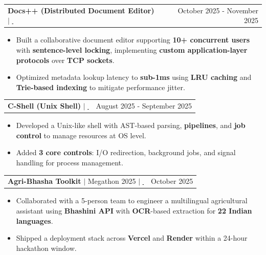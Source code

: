 \documentclass[letterpaper,11pt]{article}
\makeatletter
\newcommand{\resumeItem}[1]{
  \item \small #1\vspace{-3pt}
}
\newcommand{\resumeProjectHeading}[2]{
    \item
    \begin{tabular*}{0.97\textwidth}{l@{\extracolsep{\fill}}r}
      \small#1 & #2 \\
    \end{tabular*}\vspace{-7pt}
}
\newcommand{\extlinkicon}{\,\raisebox{0.05ex}{\footnotesize\faExternalLinkSquare}}
\newcommand{\resumeItemListStart}{\begin{itemize}}
\newcommand{\resumeItemListEnd}{\end{itemize}\vspace{-5pt}}
\makeatother
\begin{document}
    \resumeProjectHeading
          {\textbf{Docs++ (Distributed Document Editor)} $|$ \href{https://github.com/devpatel301/Docs-Plus-Plus}{\extlinkicon}}{October 2025 - November 2025}
          \resumeItemListStart
            \resumeItem{Built a collaborative document editor supporting \textbf{10+ concurrent users} with \textbf{sentence-level locking}, implementing \textbf{custom application-layer protocols} over \textbf{TCP sockets}.}
            \resumeItem{Optimized metadata lookup latency to \textbf{sub-1ms} using \textbf{LRU caching} and \textbf{Trie-based indexing} to mitigate performance jitter.}
          \resumeItemListEnd
      \resumeProjectHeading
          {\textbf{C-Shell (Unix Shell)} $|$ \href{https://github.com/devpatel301/C-Shell}{\extlinkicon}}{August 2025 - September 2025}
          \resumeItemListStart
            \resumeItem{Developed a Unix-like shell with AST-based parsing, \textbf{pipelines}, and \textbf{job control} to manage resources at OS level.}
            \resumeItem{Added \textbf{3 core controls}: I/O redirection, background jobs, and signal handling for process management.}
          \resumeItemListEnd
      
                
      \resumeProjectHeading
          {\textbf{Agri-Bhasha Toolkit} $|$ Megathon 2025 $|$ \href{https://github.com/devpatel301/agri-bhasha-test-frontend}{\extlinkicon}}{October 2025}
          \resumeItemListStart
            \resumeItem{Collaborated with a 5-person team to engineer a multilingual agricultural assistant using \textbf{Bhashini API} with \textbf{OCR}-based extraction for \textbf{22 Indian languages}.}
            \resumeItem{Shipped a deployment stack  across \textbf{Vercel} and \textbf{Render} within a 24-hour hackathon window.}
          \resumeItemListEnd
      
\end{document}
